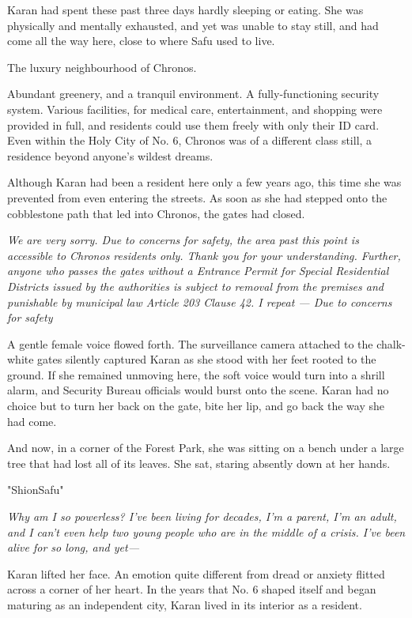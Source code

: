 Karan had spent these past three days hardly sleeping or eating. She was
physically and mentally exhausted, and yet was unable to stay still, and
had come all the way here, close to where Safu used to live.

The luxury neighbourhood of Chronos.

Abundant greenery, and a tranquil environment. A fully-functioning
security system. Various facilities, for medical care, entertainment,
and shopping were provided in full, and residents could use them freely
with only their ID card. Even within the Holy City of No. 6, Chronos was
of a different class still, a residence beyond anyone's wildest dreams.

Although Karan had been a resident here only a few years ago, this time
she was prevented from even entering the streets. As soon as she had
stepped onto the cobblestone path that led into Chronos, the gates had
closed.

\emph{We are very sorry. Due to concerns for safety, the area past this point
is accessible to Chronos residents only. Thank you for your
understanding. Further, anyone who passes the gates without a Entrance
Permit for Special Residential Districts issued by the authorities is
subject to removal from the premises and punishable by municipal law
Article 203 Clause 42. I repeat --- Due to concerns for safety\el }

A gentle female voice flowed forth. The surveillance camera attached to
the chalk-white gates silently captured Karan as she stood with her feet
rooted to the ground. If she remained unmoving here, the soft voice
would turn into a shrill alarm, and Security Bureau officials would
burst onto the scene. Karan had no choice but to turn her back on the
gate, bite her lip, and go back the way she had come.

And now, in a corner of the Forest Park, she was sitting on a bench
under a large tree that had lost all of its leaves. She sat, staring
absently down at her hands.

"Shion\el Safu\el "

\emph{Why am I so powerless? I've been living for decades, I'm a parent, I'm
an adult, and I can't even help two young people who are in the middle
of a crisis. I've been alive for so long, and yet---}

Karan lifted her face. An emotion quite different from dread or anxiety
flitted across a corner of her heart. In the years that No. 6 shaped
itself and began maturing as an independent city, Karan lived in its
interior as a resident.

